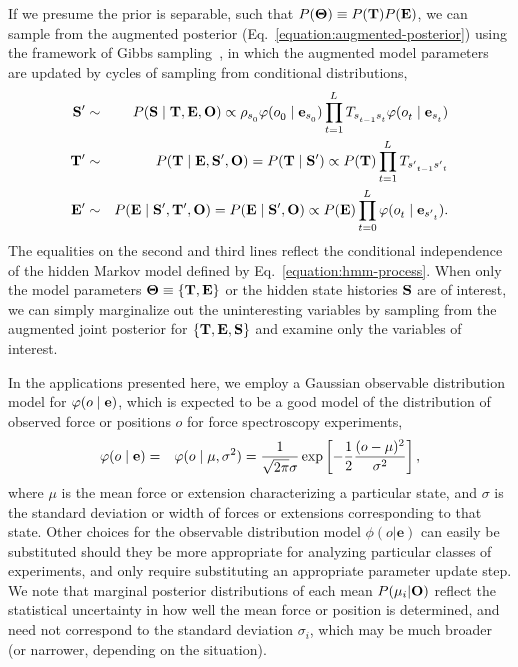 \documentclass[aps,pre,twocolumn,superscriptaddress,nofootinbib,longbibliography]{revtex4-1}
\newcommand{\bfm}[1]{{\bf #1}}
\begin{document}
{If we presume the prior is separable, such that $P(\bfm{\Theta}) \equiv P(\bfm{T}) P(\bfm{E})$, we can sample from the augmented posterior (Eq.~\ref{equation:augmented-posterior}) using the framework of Gibbs sampling~\cite{jun-s-liu:mcmc}, in which the augmented model parameters are updated by cycles of sampling from conditional distributions,
\begin{eqnarray}
\bfm{S}' &\sim& P(\bfm{S} \mid \bfm{T}, \bfm{E}, \bfm{O}) \propto \rho_{s^{}_{0}} \varphi(o^{}_{0} \mid \bfm{e}_{s^{}_{0}}) \prod_{t=1}^{L^{}} T_{s^{}_{t-1} s^{}_{t}} \varphi(o^{}_{t} \mid \bfm{e}_{s^{}_{t}}) \nonumber \\
\bfm{T}' &\sim& P(\bfm{T} \mid \bfm{E}, \bfm{S}', \bfm{O}) = P(\bfm{T} \mid \bfm{S}') \propto P(\bfm{T}) \prod_{t=1}^{L^{}} T_{{s'}^{}_{t-1} {s'}^{}_{t}} \label{equation:conditional-gibbs} \\
\bfm{E}' &\sim& P(\bfm{E} \mid \bfm{S}', \bfm{T}', \bfm{O}) = P(\bfm{E} \mid \bfm{S}', \bfm{O}) \propto P(\bfm{E}) \prod_{t=0}^{L^{}} \varphi(o^{}_{t} \mid \bfm{e}_{{s'}^{}_{t}}) \nonumber .
\end{eqnarray}
The equalities on the second and third lines reflect the conditional independence of the hidden Markov model defined by Eq.~\ref{equation:hmm-process}.
When only the model parameters $\bfm{\Theta} \equiv \{ \bfm{T}, \bfm{E} \}$ or the hidden state histories $\bfm{S}$ are of interest, we can simply marginalize out the uninteresting variables by sampling from the augmented joint posterior for $\{\bfm{T}, \bfm{E}, \bfm{S}\}$ and examine only the variables of interest.

In the applications presented here, we employ a Gaussian observable distribution model for $\varphi(o \mid \bfm{e})$, which is expected to be a good model of the distribution of observed force or positions $o$ for force spectroscopy experiments,
\begin{eqnarray}
\varphi(o \mid \bfm{e}) &=& \varphi(o \mid \mu, \sigma^2) = \frac{1}{\sqrt{2 \pi} \sigma} \exp\left[-\frac{1}{2}\frac{(o - \mu)^2}{\sigma^2} \right] \label{equation:gaussian-observable} ,
\end{eqnarray}
where $\mu$ is the mean force or extension characterizing a particular state, and $\sigma$ is the standard deviation or width of forces or extensions corresponding to that state.
Other choices for the observable distribution model $\phi(o | \mathbf{e})$ can easily be substituted should they be more appropriate for analyzing particular classes of experiments, and only require substituting an appropriate parameter update step.
We note that marginal posterior distributions of each mean $P(\mu_i | \bfm{O})$ reflect the statistical uncertainty in how well the mean force or position is determined, and need not correspond to the standard deviation $\sigma_i$, which may be much broader (or narrower, depending on the situation).

}
\end{document}
